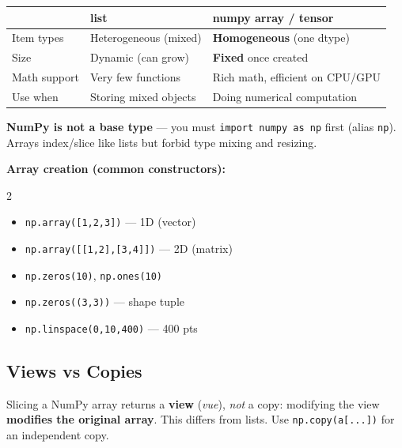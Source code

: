 \documentclass[10pt,a4paper]{article}
\begin{document}
	\begin{center}
		\begin{tabular}{lll}
			\toprule
			& \textbf{list} & \textbf{numpy array / tensor} \\
			\midrule
			Item types   & Heterogeneous (mixed) & \textbf{Homogeneous} (one dtype) \\
			Size         & Dynamic (can grow)    & \textbf{Fixed} once created \\
			Math support & Very few functions    & Rich math, efficient on CPU/GPU \\
			Use when     & Storing mixed objects & Doing numerical computation \\
			\bottomrule
		\end{tabular}
	\end{center}

	\begin{importantbox}
		\textbf{NumPy is not a base type} --- you must \texttt{import numpy as np} first (alias \texttt{np}). Arrays index/slice like lists but forbid type mixing and resizing.
	\end{importantbox}

	\textbf{Array creation (common constructors):}
	\begin{multicols}{2}
		\begin{itemize}[leftmargin=*]
			\item \texttt{np.array([1,2,3])} --- 1D (vector)
			\item \texttt{np.array([[1,2],[3,4]])} --- 2D (matrix)
			\item \texttt{np.zeros(10)}, \texttt{np.ones(10)}
			\item \texttt{np.zeros((3,3))} --- shape tuple
			\item \texttt{np.linspace(0,10,400)} --- 400 pts
		\end{itemize}
	\end{multicols}

	\subsection{Views vs Copies}

	\begin{importantbox}
		Slicing a NumPy array returns a \textbf{view} (\emph{vue}), \emph{not} a copy: modifying the view \textbf{modifies the original array}. This differs from lists. Use \texttt{np.copy(a[...])} for an independent copy.
	\end{importantbox}
\end{document}
